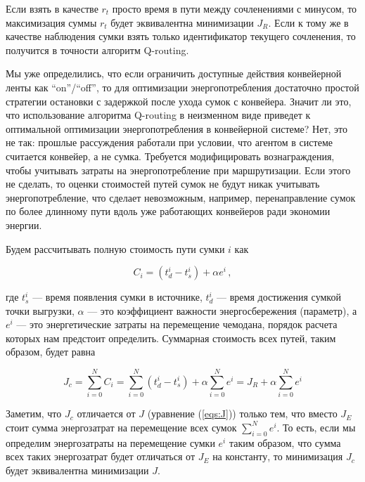 \documentclass[specification,annotation,times]{itmo-student-thesis}
\theoremstyle{definition}
\begin{document}
Если взять в качестве $r_t$ просто время в пути между сочленениями с минусом, то
максимизация суммы $r_t$ будет эквивалентна минимизации $J_R$. Если к тому же в качестве 
наблюдения сумки взять только идентификатор текущего сочленения, то получится в
точности алгоритм Q-routing.

Мы уже определились, что если ограничить доступные действия конвейерной
ленты как ``on''/``off'', то для оптимизации энергопотребления достаточно
простой стратегии остановки с задержкой после ухода сумок с конвейера.
Значит ли это, что использование алгоритма Q-routing в неизменном виде приведет
к оптимальной оптимизации энергопотребления в конвейерной системе? Нет, это не
так: прошлые рассуждения работали при условии, что агентом в системе считается
конвейер, а не сумка. Требуется модифицировать вознаграждения, чтобы учитывать
затраты на энергопотребление при маршрутизации. Если этого не сделать, то
оценки стоимостей путей сумок не будут никак учитывать энергопотребление, что
сделает невозможным, например, перенаправление сумок по более длинному пути
вдоль уже работающих конвейеров ради экономии энергии.

Будем рассчитывать полную стоимость пути сумки $i$ как

\begin{equation}
  C_i = (t_d^i - t_s^i) + \alpha e^i \,,
\end{equation}

где $t_s^i$ --- время появления сумки в источнике, $t_d^i$ --- время достижения
сумкой точки выгрузки, $\alpha$ --- это коэффициент важности энергосбережения
(параметр), а $e^i$ --- это энергетические затраты на перемещение чемодана,
порядок расчета которых нам предстоит определить. Суммарная стоимость всех
путей, таким образом, будет равна

\begin{equation}\label{eqs:J_c}
  J_c = \sum\limits_{i=0}^{N} C_i = \sum\limits_{i=0}^{N} (t_d^i - t_s^i)
  + \alpha \sum\limits_{i=0}^{N} e^i = J_R + \alpha \sum\limits_{i=0}^{N} e^i
\end{equation}

Заметим, что $J_c$ отличается от $J$ (уравнение (\ref{eqs:J})) только тем, что
вместо $J_E$ стоит сумма энергозатрат на перемещение всех сумок
$\sum\limits_{i=0}^{N} e^i$. То есть, если мы определим энергозатраты на
перемещение сумки $e^i$ таким образом, что сумма всех таких энергозатрат будет
отличаться от $J_E$ на константу, то минимизация $J_c$ будет эквивалентна
минимизации $J$.
\end{document}
